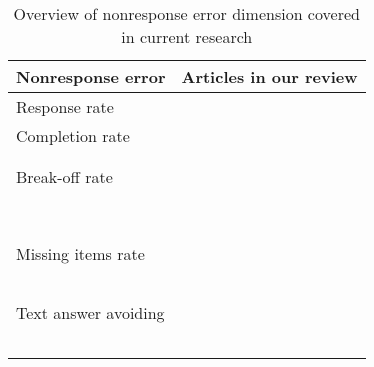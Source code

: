 \begin{table}
    \centering
	\begin{tabular}{ll}
		\toprule
		Nonresponse error & Articles in our review\\
		\midrule
		Response rate & \cite{lambert_living_2015, tourangeau_web_2018}\\
        Completion rate & \cite{ha_are_2019, ha_data_2020}\\
    	& \cite{mavletova_data_2013, mavletova_grid_2018}\\
    	& \cite{ buskirk_making_2014, mavletova_sensitive_2013}\\
        Break-off rate & \cite{erens_comparing_2019, mavletova_data_2013}\\
    	& \cite{hartman_does_2019, liebe_does_2015}\\
    	& \cite{lee_experimental_2019, mavletova_grid_2018}\\
    	& \cite{lambert_living_2015}\\
    	& \cite{bosch_measurement_2019}\\
    	& \cite{schlosser_mobile_2018, brosnan_pc_2017}\\
    	& \cite{mavletova_sensitive_2013, keusch_web_2017}\\
    	& \cite{toepoel_what_2014, steinbrecher_why_2015}\\
    	& \cite{couper_why_2017}\\
        Missing items rate & \cite{revilla_are_2017, erens_comparing_2019}\\
    	& \cite{revilla_comparing_2018, lee_experimental_2019}\\
    	& \cite{buskirk_making_2014, daikeler_motivated_2020}\\
    	& \cite{toepoel_sliders_2018, struminskaya_effects_2015}\\
    	& \cite{lugtig_use_2016, tourangeau_web_2018}\\
    	& \cite{keusch_web_2017}\\
    	Text answer avoiding & \cite{erens_comparing_2019, wells_comparison_2014}\\
    	& \cite{ha_data_2020, antoun_effects_2017}\\
    	& \cite{de_bruijne_improving_2014}\\
    	& \cite{schlosser_mobile_2018}\\
    	& \cite{revilla_open_2016, struminskaya_effects_2015}\\
    	& \cite{toepoel_what_2014}\\
    	\bottomrule
    \end{tabular}
	\caption{Overview of nonresponse error dimension covered in current research}
	\label{tab: nonresponse}
\end{table}

